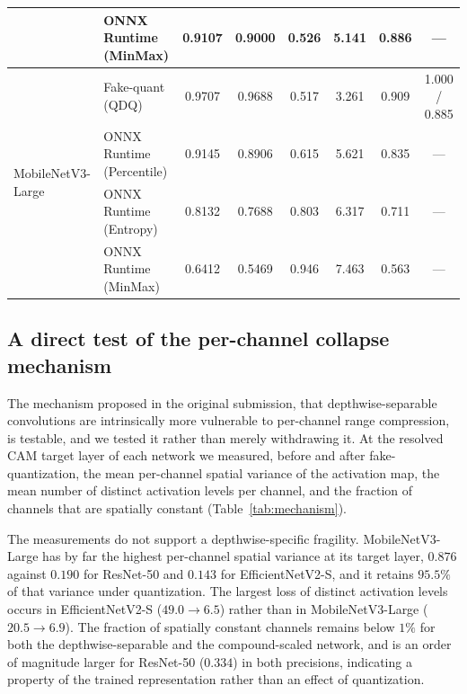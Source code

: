 \documentclass[fleqn,10pt]{wlscirep}
\begin{document}
\begin{table}[htbp]
\begin{tabular}{llcccccc}
  & ONNX Runtime (MinMax) & 0.9107 & 0.9000 & 0.526 & 5.141 & 0.886 & --- \\
\midrule
\multirow{4}{*}{MobileNetV3-Large}
  & Fake-quant (QDQ) & 0.9707 & 0.9688 & 0.517 & 3.261 & 0.909 & 1.000 / 0.885 \\
  & ONNX Runtime (Percentile) & 0.9145 & 0.8906 & 0.615 & 5.621 & 0.835 & --- \\
  & ONNX Runtime (Entropy) & 0.8132 & 0.7688 & 0.803 & 6.317 & 0.711 & --- \\
  & ONNX Runtime (MinMax) & 0.6412 & 0.5469 & 0.946 & 7.463 & 0.563 & --- \\
\bottomrule
\end{tabular}
\end{table}

\subsection*{A direct test of the per-channel collapse mechanism}

The mechanism proposed in the original submission, that depthwise-separable convolutions are intrinsically more vulnerable to per-channel range compression, is testable, and we tested it rather than merely withdrawing it. At the resolved CAM target layer of each network we measured, before and after fake-quantization, the mean per-channel spatial variance of the activation map, the mean number of distinct activation levels per channel, and the fraction of channels that are spatially constant (Table~\ref{tab:mechanism}).

The measurements do not support a depthwise-specific fragility. MobileNetV3-Large has by far the highest per-channel spatial variance at its target layer, $0.876$ against $0.190$ for ResNet-50 and $0.143$ for EfficientNetV2-S, and it retains $95.5\%$ of that variance under quantization. The largest loss of distinct activation levels occurs in EfficientNetV2-S ($49.0 \rightarrow 6.5$) rather than in MobileNetV3-Large ($20.5 \rightarrow 6.9$). The fraction of spatially constant channels remains below $1\%$ for both the depthwise-separable and the compound-scaled network, and is an order of magnitude larger for ResNet-50 ($0.334$) in both precisions, indicating a property of the trained representation rather than an effect of quantization.
\end{document}
